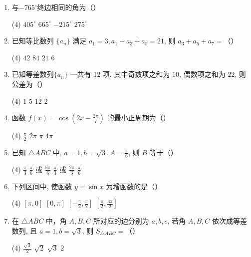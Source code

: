 \documentclass[17pt,twoside,space]{ctexart}
\begin{document}
\begin{enumerate}[itemsep=0.2em,topsep=0pt]

\item 与$-765^\circ$终边相同的角为（\hspace{7pt}）
\begin{tasks}(4)
	\task $405^\circ$ \task $665^\circ$ \task $-215^\circ$ \task $275^\circ$ 
\end{tasks}

\item 已知等比数列 $\{a_n\}$ 满足 $a_1 = 3, a_1 + a_3 + a_5 = 21$, 则 $a_3 + a_5 + a_7 =$（\hspace{7pt}）
\begin{tasks}(4)
	\task $42$ \task $84$ \task $21$ \task $6$ 
\end{tasks}

\item 已知等差数列$\{a_n\}$ 一共有 $12$ 项, 其中奇数项之和为 $10$, 偶数项之和为 $22$, 则公差为（\hspace{7pt}）
\begin{tasks}(4)
	\task $1$ \task $5$ \task $12$ \task $2$ 
\end{tasks}

\item 函数 $f(x) = \cos (2x - \frac{2\pi }{7})$ 的最小正周期为（\hspace{7pt}）
\begin{tasks}(4)
	\task $\frac{\pi}{2}$ \task $2\pi$ \task $\pi$ \task $4\pi$ 
\end{tasks}


\item 已知 $\triangle ABC$ 中, $a = 1, b = \sqrt{3}, A = \frac{\pi}{6}$, 则 $B$ 等于（\hspace{7pt}）
\begin{tasks}(4)
	\task $\frac{\pi}{3}$ \task $\frac{\pi}{6}$ 或 $\frac{5\pi}{6}$ \task $\frac{\pi}{3}$ 或 $\frac{2\pi}{3}$ \task $\frac{\pi}{6}$ 
\end{tasks}

\item 下列区间中, 使函数 $y=\sin x$ 为增函数的是（\hspace{7pt}）
\begin{tasks}(4)
	\task $[\pi , 0]$ \task $[0, \pi]$ \task $[-\frac{\pi }{2}, \frac{\pi }{2}]$ \task $[\frac{\pi }{2}, \frac{3\pi }{2}]$ 
\end{tasks}


\item 在 $\triangle ABC$ 中，角 $A, B, C$ 所对应的边分别为 $a, b, c$, 若角 $A, B, C$ 依次成等差数列, 且 $a = 1, b = \sqrt{3}$, 则 $S_{\triangle ABC} =$（\hspace{7pt}）
\begin{tasks}(4)
	\task $\frac{\sqrt{3}}{2}$ \task $\sqrt{2}$ \task $\sqrt{3}$ \task $2$
\end{tasks}


\end{enumerate}
\end{document}
